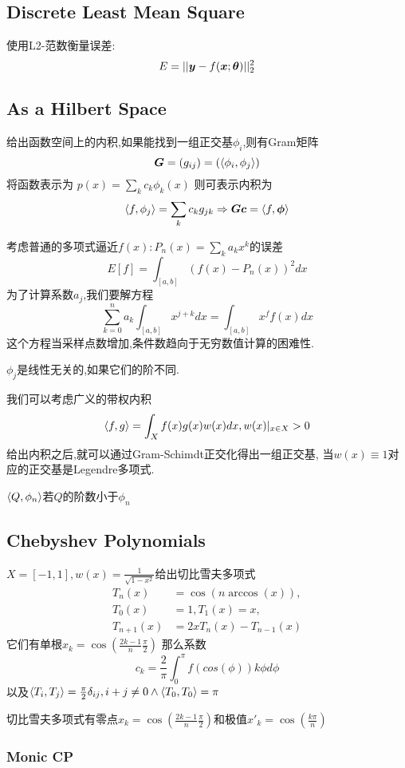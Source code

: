 \documentclass{article}
\begin{document}
\subsection{Discrete Least Mean Square}

使用L2-范数衡量误差:
$$
E=||\boldsymbol{y}-f(\boldsymbol{x};\boldsymbol{\theta})||_2^2
$$

\subsection{As a Hilbert Space}

给出函数空间上的内积,如果能找到一组正交基$\phi_i$,则有Gram矩阵
$$\boldsymbol{G}=(g_{ij})=(\langle \phi_i, \phi_j \rangle)$$
将函数表示为
$p(x)=\sum_k c_k \phi_k(x)$
则可表示内积为
$$\langle f, \phi_j \rangle=\sum_k c_k g_{jk}\Rightarrow \boldsymbol{G}\boldsymbol{c}=\langle f, \boldsymbol{\phi} \rangle$$

考虑普通的多项式逼近$f(x):P_n(x)=\sum_k a_k x^k$的误差
$$
E[f]=\int_{[a,b]}(f(x)-P_n(x))^2 dx
$$
为了计算系数$a_j$,我们要解方程
$$
\sum_{k=0}^n a_k\int_{[a,b]}x^{j+k} dx=\int_{[a,b]}x^f f(x) dx
$$
这个方程当采样点数增加,条件数趋向于无穷\tRarr 数值计算的困难性.

\trm $\phi_j$是线性无关的,如果它们的阶不同.

我们可以考虑广义的带权内积
$$
\langle f, g \rangle=\int_X f(x)g(x)w(x) dx,w(x)|_{x\in X}>0
$$
给出内积之后,就可以通过Gram-Schimdt正交化得出一组正交基,
当$w(x)\equiv 1$对应的正交基是Legendre多项式.

\trm $\langle Q, \phi_n \rangle$若$Q$的阶数小于$\phi_n$

\subsection{Chebyshev Polynomials}

$X=[-1,1], w(x)=\frac{1}{\sqrt{1-x^2}}$给出切比雪夫多项式
$$
\begin{aligned}
    T_n(x)     & =\cos (n \arccos(x)), \\
    T_0(x)     & =1,T_1(x)=x,          \\
    T_{n+1}(x) & =2xT_n(x)-T_{n-1}(x)
\end{aligned}
$$
它们有单根$x_k=\cos(\frac{2k-1}{n}\frac{\pi}{2})$
那么系数
$$
c_k=\frac{2}{\pi}\int^{\pi}_0 f(cos(\phi)) k\phi d\phi
$$
以及$\langle T_i, T_j \rangle=\frac{\pi}{2}\delta_{ij},i+j\neq 0\wedge \langle T_0, T_0 \rangle=\pi$

\trm 切比雪夫多项式有零点$x_k=\cos(\frac{2k-1}{n}\frac{\pi}{2})$和极值$x'_k=\cos(\frac{k\pi}{n})$

\subsubsection{Monic CP}
\end{document}
